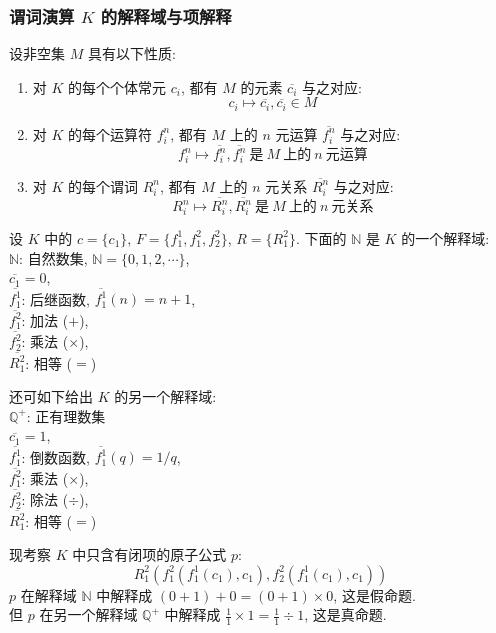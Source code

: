 \documentclass[
    color=black,
    device=normal,
    lang=cn
]{elegantnote}
\begin{document}
\subsubsection{谓词演算 \texorpdfstring{$K$}{K} 的解释域与项解释}
\begin{definition}[$K$ 的解释域]
    设非空集 $M$ 具有以下性质:
    \begin{enumerate}[label = $\arabic*^\circ$]
        \item 对 $K$ 的每个个体常元 $c_i$, 都有 $M$ 的元素 $\overline{c_i}$ 与之对应: $$c_i\mapsto \overline{c_i}, \overline{c_i}\in M$$
        \item 对 $K$ 的每个运算符 $f_i^n$, 都有 $M$ 上的 $n$ 元运算 $\overline{f_i^n}$ 与之对应: $$f_i^n\mapsto \overline{f_i^n}, \overline{f_i^n}\ \text{是}\ M\ \text{上的}\ n\ \text{元运算}$$
        \item 对 $K$ 的每个谓词 $R_i^n$, 都有 $M$ 上的 $n$ 元关系 $\overline{R_i^n}$ 与之对应: $$R_i^n\mapsto \overline{R_i^n}, \overline{R_i^n}\ \text{是}\ M\ \text{上的}\ n\ \text{元关系}$$
    \end{enumerate}
\end{definition}
\begin{example}
    设 $K$ 中的 $c = \{c_1\}$, $F=\{f_1^1, f_1^2, f_2^2\}$, $R=\{R_1^2\}$. 下面的 $\mathbb{N}$ 是 $K$ 的一个解释域:\\
    $\mathbb{N}$: 自然数集, $\mathbb{N}=\{0, 1, 2, \cdots\}$,\\
    $\overline{c_1}=0$,\\
    $\overline{f_1^1}$: 后继函数, $\overline{f_1^1}(n)=n+1$,\\
    $\overline{f_1^2}$: 加法 ($+$),\\
    $\overline{f_2^2}$: 乘法 ($\times$),\\
    $\overline{R_1^2}$: 相等 ($=$)

    还可如下给出 $K$ 的另一个解释域:\\
    $\mathbb{Q}^+$: 正有理数集\\
    $\overline{c_1}=1$,\\
    $\overline{f_1^1}$: 倒数函数, $\overline{f_1^1}(q)=1/q$,\\
    $\overline{f_1^2}$: 乘法 ($\times$),\\
    $\overline{f_2^2}$: 除法 ($\div$),\\
    $\overline{R_1^2}$: 相等 ($=$)

    现考察 $K$ 中只含有闭项的原子公式 $p$:
    $$
        R_1^2(f_1^2(f_1^1(c_1), c_1), f_2^2(f_1^1(c_1), c_1))
    $$
    $p$ 在解释域 $\mathbb{N}$ 中解释成 $(0+1)+0=(0+1)\times 0$, 这是假命题.\\
    但 $p$ 在另一个解释域 $\mathbb{Q}^+$ 中解释成 $\displaystyle \frac{1}{1}\times 1 = \frac{1}{1}\div 1$, 这是真命题.
\end{example}
\end{document}
